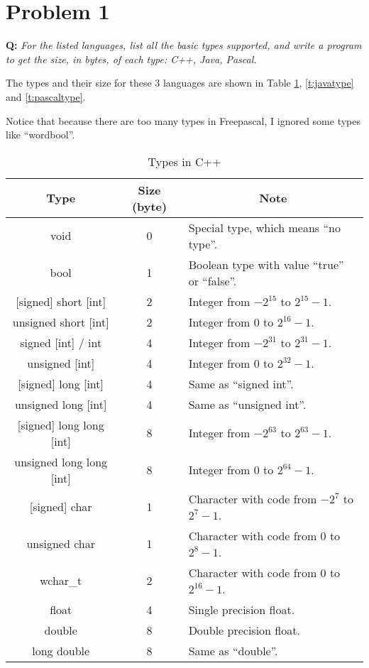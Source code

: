 \documentclass{article}
\begin{document}
\section*{Problem 1}
\textbf{Q:} \textit{For the listed languages, list all the basic types supported, and write a program to get the size, in bytes, of each type: C++, Java, Pascal.}

The types and their size for these 3 languages are shown in Table \ref{t:cpptype}, \ref{t:javatype} and \ref{t:pascaltype}.

Notice that because there are too many types in Freepascal, I ignored some types like ``wordbool''.

\begin{table}[hp]
\centering
\begin{tabular}{ccl}
\toprule
Type & Size (byte) & \multicolumn{1}{c}{Note} \\
\midrule
void & 0 & Special type, which means ``no type''. \\
bool & 1 & Boolean type with value ``true'' or ``false''. \\
{[signed]} short {[int]} & 2 & Integer from $-2^{15}$ to $2^{15}-1$. \\
unsigned short {[int]} & 2 & Integer from $0$ to $2^{16}-1$. \\
signed {[int]} / int & 4 & Integer from $-2^{31}$ to $2^{31}-1$. \\
unsigned {[int]} & 4 & Integer from $0$ to $2^{32}-1$. \\
{[signed]} long {[int]} & 4 & Same as ``signed int''. \\
unsigned long {[int]} & 4 & Same as ``unsigned int''. \\
{[signed]} long long {[int]} & 8 & Integer from $-2^{63}$ to $2^{63}-1$. \\
unsigned long long {[int]} & 8 & Integer from $0$ to $2^{64}-1$. \\
{[signed]} char & 1 & Character with code from $-2^7$ to $2^7-1$. \\
unsigned char & 1 & Character with code from $0$ to $2^8-1$. \\
wchar\_t & 2 & Character with code from $0$ to $2^{16}-1$. \\
float & 4 & Single precision float. \\
double & 8 & Double precision float. \\
long double & 8 & Same as ``double''. \\
\bottomrule
\end{tabular}
\caption{Types in C++}
\label{t:cpptype}
\end{table}
\end{document}
